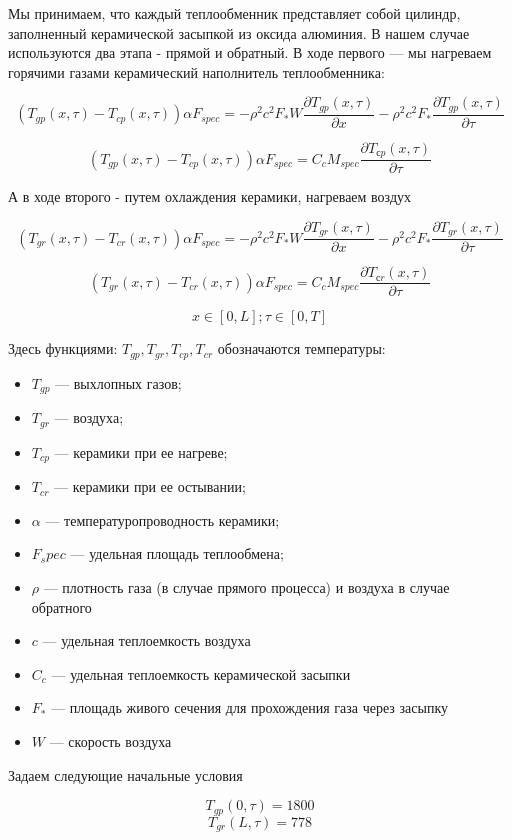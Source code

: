 \documentclass[a4paper,12pt]{article}
\begin{document}
  Мы принимаем, что каждый теплообменник представляет собой цилиндр,
  заполненный керамической засыпкой из оксида алюминия. В нашем случае
  используются два этапа - прямой и обратный. В ходе первого — мы
  нагреваем горячими газами керамический наполнитель теплообменника:

  $$(T_{gp}(x,\tau) - T_{cp}(x,\tau)) \alpha F_{spec} = - \rho^2 c^2 F_* W\frac{\partial T_{gp}(x,\tau)}{\partial x} - \rho^2 c^2 F_*\frac{\partial T_{gp}(x,\tau)}{\partial \tau}$$

  $$(T_{gp}(x,\tau) - T_{cp}(x,\tau))\alpha F_{spec}=  C_c M_{spec} \frac{\partial T_{сp}(x,\tau)}{\partial \tau}$$

  А в ходе второго - путем охлаждения керамики, нагреваем воздух

  $$(T_{gr}(x,\tau) - T_{cr}(x,\tau)) \alpha F_{spec} = - \rho^2 c^2 F_* W\frac{\partial T_{gr}(x,\tau)}{\partial x} - \rho^2 c^2 F_*\frac{\partial T_{gr}(x,\tau)}{\partial \tau}$$

  $$(T_{gr}(x,\tau) - T_{cr}(x,\tau))\alpha F_{spec}=  C_c M_{spec} \frac{\partial T_{сr}(x,\tau)}{\partial \tau}$$

  $$x \in [0, L]; \tau \in [0, T]$$

  Здесь функциями: $T_{gp}, T_{gr}, T_{cp}, T_{cr}$ обозначаются температуры:
\begin{itemize}
\item $T_{gp}$ — выхлопных газов;
\item $T_{gr}$ — воздуха;
\item $T_{cp}$ — керамики при ее нагреве;
\item $T_{cr}$ — керамики при ее остывании;
\item $\alpha$ — температуропроводность керамики;
\item $F_spec$ — удельная площадь теплообмена;
\item $\rho$ —  плотность газа (в случае прямого процесса) и воздуха в случае обратного
\item $c$ — удельная теплоемкость воздуха
\item  $C_c$  — удельная теплоемкость керамической засыпки
\item $F_*$ — площадь живого сечения для прохождения газа через засыпку
\item $W$ — скорость воздуха
\end{itemize}

Задаем следующие начальные условия

$$T_{gp}(0,\tau) = 1800$$
$$T_{gr}(L,\tau) = 778$$
\end{document}
